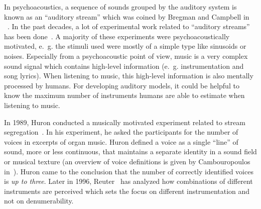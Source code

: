In psychoacoustics, a sequence of sounds grouped by the auditory system is known as an ``auditory stream'' which was coined by Bregman and Campbell in ~\cite{Bregman1971}.
In the past decades, a lot of experimental work related to ``auditory streams'' has been done~\cite{bregman90}.
A majority of these experiments were psychoacoustically motivated, e.~g. the stimuli used were mostly of a simple type like sinusoids or noises.
Especially from a psychoacoustic point of view, music is a very complex sound signal which contains high-level information (e.~g. instrumentation and song lyrics).
When listening to music, this high-level information is also mentally processed by humans.
For developing auditory models, it could be helpful to know the maximum number of instruments humans are able to estimate when listening to music.
\par
In 1989, Huron conducted a musically motivated experiment related to stream segregation~\cite{Huron1989}. In his experiment, he asked the participants for the number of voices in excerpts of organ music.
Huron defined a voice as a single ``line'' of sound, more or less continuous, that maintains a separate identity in a sound field or musical texture (an overview of voice definitions is given by Cambouropoulos in~\cite{Cambouropoulos2008}).
Huron came to the conclusion that the number of correctly identified voices is \emph{up to three}.
Later in 1996, Reuter~\cite{reuter96} has analyzed how combinations of different instruments are perceived which sets the focus on different instrumentation and not on denumerability.



